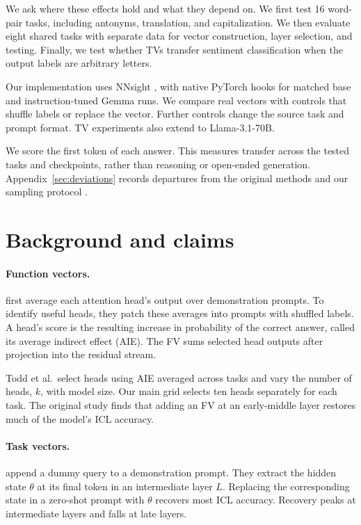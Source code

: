 \documentclass[11pt]{article}
\begin{document}
We ask where these effects hold and what they depend on. We first test 16 word-pair tasks, including antonyms, translation, and capitalization. We then evaluate eight shared tasks with separate data for vector construction, layer selection, and testing. Finally, we test whether TVs transfer sentiment classification when the output labels are arbitrary letters.

Our implementation uses NNsight \citep{fiottokaufman2025nnsight}, with native PyTorch hooks for matched base and instruction-tuned Gemma runs. We compare real vectors with controls that shuffle labels or replace the vector. Further controls change the source task and prompt format. TV experiments also extend to Llama-3.1-70B.

We score the first token of each answer. This measures transfer across the tested tasks and checkpoints, rather than reasoning or open-ended generation. Appendix~\ref{sec:deviations} records departures from the original methods and our sampling protocol \citep{pineau2021improving}.

\section{Background and claims}
\label{sec:claims}

\paragraph{Function vectors.} \citet{todd2024function} first average each attention head's output over demonstration prompts. To identify useful heads, they patch these averages into prompts with shuffled labels. A head's score is the resulting increase in probability of the correct answer, called its average indirect effect (AIE). The FV sums selected head outputs after projection into the residual stream.

Todd et al.\ select heads using AIE averaged across tasks and vary the number of heads, $k$, with model size. Our main grid selects ten heads separately for each task. The original study finds that adding an FV at an early-middle layer restores much of the model's ICL accuracy.

\paragraph{Task vectors.} \citet{hendel2023incontext} append a dummy query to a demonstration prompt. They extract the hidden state $\theta$ at its final token in an intermediate layer $L$. Replacing the corresponding state in a zero-shot prompt with $\theta$ recovers most ICL accuracy. Recovery peaks at intermediate layers and falls at late layers.
\end{document}
